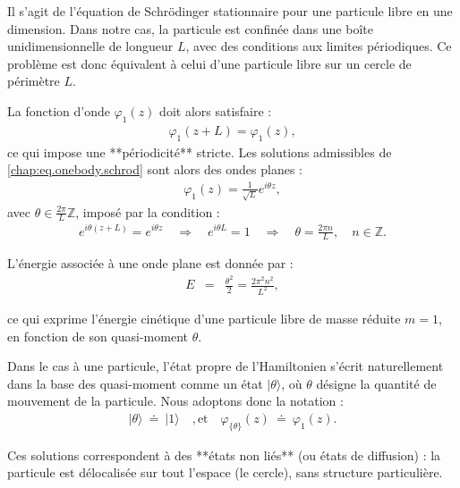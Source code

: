 



Il s'agit de l’équation de Schrödinger stationnaire pour une particule libre en une dimension. Dans notre cas, la particule est confinée dans une boîte unidimensionnelle de longueur $L$, avec des conditions aux limites périodiques. Ce problème est donc équivalent à celui d’une particule libre sur un cercle de périmètre $L$.

La fonction d’onde $\varphi_1(z)$ doit alors satisfaire :
\begin{eqnarray}
	\varphi_1(z+L) = \varphi_1(z),
\end{eqnarray}
ce qui impose une **périodicité** stricte. Les solutions admissibles de \eqref{chap:eq.onebody.schrod} sont alors des ondes planes :
\begin{eqnarray}
	\varphi_1(z) = \frac{1}{\sqrt{L}} e^{i \theta z},
\end{eqnarray}
avec $\theta \in \frac{2\pi}{L} \mathbb{Z}$, imposé par la condition :
\begin{eqnarray}
	e^{i \theta(z+L)} = e^{i \theta z} \quad \Rightarrow \quad e^{i \theta L} = 1 \quad \Rightarrow \quad \theta = \frac{2\pi n}{L}, \quad n \in \mathbb{Z}.
\end{eqnarray}

L’énergie associée à une onde plane est donnée par :
\begin{eqnarray}
	E & = & \frac{\theta^2}{2} = \frac{2\pi^2 n^2}{L^2},
\end{eqnarray}

ce qui exprime l’énergie cinétique d’une particule libre de masse réduite $m = 1$, en fonction de son quasi-moment $\theta$.

Dans le cas à une particule, l’état propre de l’Hamiltonien s’écrit naturellement dans la base des quasi-moment comme un état \(\vert \theta \rangle\), où \(\theta\) désigne la quantité de mouvement de la particule.  
Nous adoptons donc la notation :
\begin{eqnarray}
	\vert \theta \rangle ~ \doteq ~  \vert 1 \rangle \quad, \mbox{et} \quad  \varphi_{\{\theta\}}(z) ~ \doteq ~ \varphi_1(z).
\end{eqnarray}

Ces solutions correspondent à des **états non liés** (ou états de diffusion) : la particule est délocalisée sur tout l’espace (le cercle), sans structure particulière.


